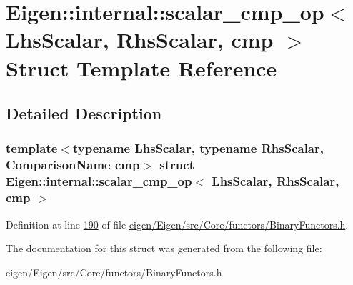 \hypertarget{struct_eigen_1_1internal_1_1scalar__cmp__op}{}\section{Eigen\+:\+:internal\+:\+:scalar\+\_\+cmp\+\_\+op$<$ Lhs\+Scalar, Rhs\+Scalar, cmp $>$ Struct Template Reference}
\label{struct_eigen_1_1internal_1_1scalar__cmp__op}


\subsection{Detailed Description}
\subsubsection*{template$<$typename Lhs\+Scalar, typename Rhs\+Scalar, Comparison\+Name cmp$>$\newline
struct Eigen\+::internal\+::scalar\+\_\+cmp\+\_\+op$<$ Lhs\+Scalar, Rhs\+Scalar, cmp $>$}



Definition at line \hyperlink{eigen_2_eigen_2src_2_core_2functors_2_binary_functors_8h_source_l00190}{190} of file \hyperlink{eigen_2_eigen_2src_2_core_2functors_2_binary_functors_8h_source}{eigen/\+Eigen/src/\+Core/functors/\+Binary\+Functors.\+h}.



The documentation for this struct was generated from the following file\+:\begin{DoxyCompactItemize}
\item 
eigen/\+Eigen/src/\+Core/functors/\+Binary\+Functors.\+h\end{DoxyCompactItemize}
